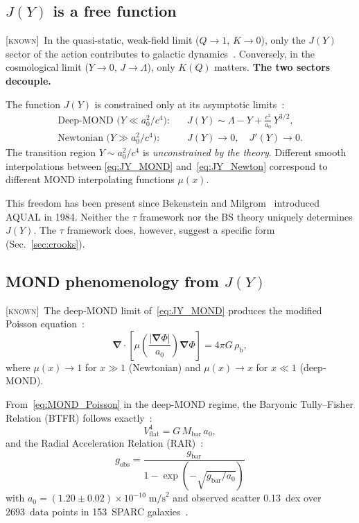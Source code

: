 \documentclass[prd,twocolumn,superscriptaddress,longbibliography,floatfix]{revtex4-2}
\newcommand{\tauasym}{\tau}
\newcommand{\known}{\textsc{[known]}}
\begin{document}
\subsection{$J(Y)$ is a free function}
\label{sec:JY}

\known\  In the quasi-static, weak-field limit ($Q \to 1$,
$K \to 0$), only the $J(Y)$ sector of the action contributes
to galactic dynamics~\cite{BS2024,BekensteinMilgrom1984}.
Conversely, in the cosmological limit ($Y \to 0$, $J \to \Lambda$),
only $K(Q)$ matters.  \textbf{The two sectors decouple.}

The function $J(Y)$ is constrained only at its asymptotic
limits~\cite{BS2024}:
\begin{align}
\text{Deep-MOND (}Y \ll a_0^2/c^4\text{):}\quad
&J(Y) \sim \Lambda - Y + \frac{c^2}{a_0}\,Y^{3/2},
\label{eq:JY_MOND}\\
\text{Newtonian (}Y \gg a_0^2/c^4\text{):}\quad
&J(Y) \to 0, \quad J'(Y) \to 0.
\label{eq:JY_Newton}
\end{align}
The transition region $Y \sim a_0^2/c^4$ is \emph{unconstrained
by the theory}.  Different smooth interpolations between
\eqref{eq:JY_MOND} and~\eqref{eq:JY_Newton} correspond to
different MOND interpolating functions $\mu(x)$.

This freedom has been present since Bekenstein and
Milgrom~\cite{BekensteinMilgrom1984} introduced AQUAL in 1984.
Neither the $\tauasym$ framework nor the BS theory uniquely
determines $J(Y)$.  The $\tauasym$ framework does, however,
suggest a specific form (Sec.~\ref{sec:crooks}).

\subsection{MOND phenomenology from $J(Y)$}

\known\  The deep-MOND limit of~\eqref{eq:JY_MOND} produces
the modified Poisson equation~\cite{BS2024,BekensteinMilgrom1984}:
\begin{equation}
\boldsymbol{\nabla}\cdot\!\left[\mu\!\left(\frac{|\boldsymbol{\nabla}\Phi|}{a_0}\right)
\boldsymbol{\nabla}\Phi\right] = 4\pi G\,\rho_{\mathrm{b}},
\label{eq:MOND_Poisson}
\end{equation}
where $\mu(x) \to 1$ for $x \gg 1$ (Newtonian) and
$\mu(x) \to x$ for $x \ll 1$ (deep-MOND).

From~\eqref{eq:MOND_Poisson} in the deep-MOND regime,
the Baryonic Tully--Fisher Relation (BTFR) follows
exactly~\cite{Milgrom1983,McGaugh2012}:
\begin{equation}
V_{\mathrm{flat}}^4 = G\,M_{\mathrm{bar}}\,a_0,
\label{eq:BTFR}
\end{equation}
and the Radial Acceleration Relation
(RAR)~\cite{McGaugh2016RAR,Lelli2017}:
\begin{equation}
g_{\mathrm{obs}} = \frac{g_{\mathrm{bar}}}{1 - \exp\!\left(
-\sqrt{g_{\mathrm{bar}}/a_0}\right)}
\label{eq:RAR}
\end{equation}
with $a_0 = (1.20 \pm 0.02) \times 10^{-10}\;\mathrm{m/s}^2$
and observed scatter 0.13~dex over 2693~data points in
153~SPARC galaxies~\cite{SPARC2016}.
\end{document}
